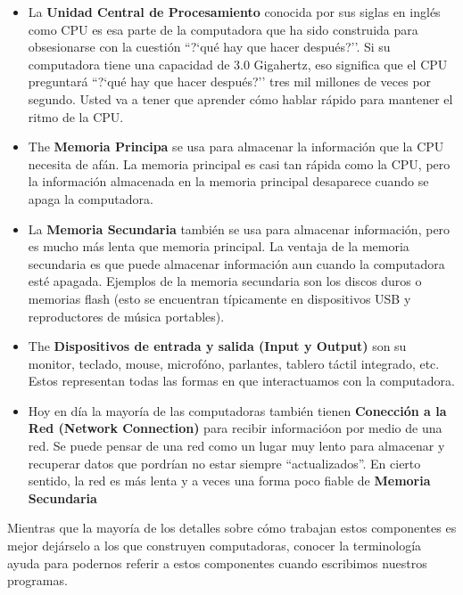 \begin{itemize}

\item La {\bf Unidad Central de Procesamiento} conocida por sus siglas en ingl\'es como CPU es esa parte de la computadora que ha sido construida para obsesionarse con la cuesti\'on ``?`qu\'e hay que hacer despu\'es?''. Si su computadora tiene una capacidad de 3.0 Gigahertz, eso significa que el CPU preguntar\'a ``?`qu\'e hay que hacer despu\'es?''
tres mil millones de veces por segundo. Usted va a tener que aprender c\'omo hablar r\'apido para mantener el ritmo de la CPU.

\item The {\bf Memoria Principa} se usa para almacenar la informaci\'on
que la CPU necesita de af\'an. La memoria principal es casi tan r\'apida como la CPU, pero la informaci\'on almacenada en la memoria principal desaparece cuando se apaga la computadora.

\item La {\bf Memoria Secundaria} tambi\'en se usa para almacenar informaci\'on, pero es mucho m\'as lenta que memoria principal.
La ventaja de la memoria secundaria es que puede almacenar informaci\'on aun cuando la computadora est\'e apagada. Ejemplos de la memoria secundaria son los discos duros o memorias flash (esto se encuentran t\'ipicamente en dispositivos USB y reproductores de m\'usica portables).

\item The {\bf Dispositivos de entrada y salida (Input y Output)} son su monitor, teclado, mouse, microf\'ono, parlantes, tablero t\'actil integrado, etc.  
Estos representan todas las formas en que interactuamos con la computadora.

\item Hoy en d\'ia la mayor\'ia de las computadoras tambi\'en tienen
{\bf Conecci\'on a la Red (Network Connection)} para recibir informaci\'oon por medio de una red.
Se puede pensar de una red como un lugar muy lento para almacenar y recuperar datos que pordr\'ian no estar siempre ``actualizados''. En cierto sentido, la red es m\'as lenta y a veces una forma poco fiable de
{\bf Memoria Secundaria}

\end{itemize}

Mientras que la mayor\'ia de los detalles sobre c\'omo trabajan estos componentes es mejor dej\'arselo a los  que construyen computadoras, conocer la terminolog\'ia ayuda para podernos referir a estos componentes cuando escribimos nuestros programas.

